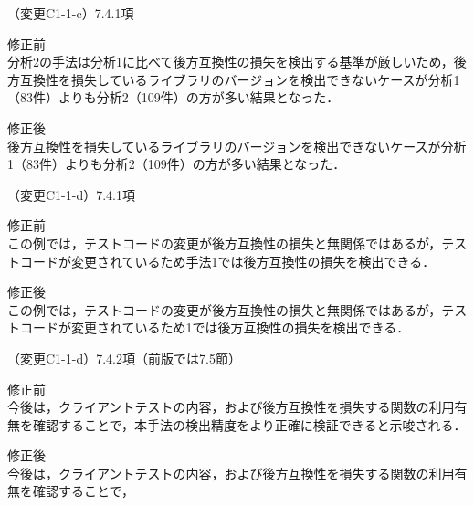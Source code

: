 \documentclass{jarticle} %
\def\subsection#1{ \vspace{1pc} {\gt #1} }
\begin{document}
\subsection{（変更C1-1-c）7.4.1項}
\vspace{-0.3cm}
\begin{description}
\item 修正前\\
\phantom{　}
分析2の手法は分析1に比べて後方互換性の損失を検出する基準が厳しいため，後方互換性を損失しているライブラリのバージョンを検出できないケースが分析1（83件）よりも分析2（109件）の方が多い結果となった．
\vspace{-0.3cm}
\item 修正後\\
\phantom{　}
\textcolor{red}{}後方互換性を損失しているライブラリのバージョンを検出できないケースが分析1（83件）よりも分析2（109件）の方が多い結果となった．
\end{description}

\subsection{（変更C1-1-d）7.4.1項}
\vspace{-0.3cm}
\begin{description}
\item 修正前\\
\phantom{　}
この例では，テストコードの変更が後方互換性の損失と無関係ではあるが，テストコードが変更されているため手法1では後方互換性の損失を検出できる．
\vspace{-0.3cm}
\item 修正後\\
\phantom{　}
この例では，テストコードの変更が後方互換性の損失と無関係ではあるが，テストコードが変更されているため\textcolor{red}{}1では後方互換性の損失を検出できる．
\end{description}

\subsection{（変更C1-1-d）7.4.2項（前版では7.5節）}
\vspace{-0.3cm}
\begin{description}
\item 修正前\\
\phantom{　}
今後は，クライアントテストの内容，および後方互換性を損失する関数の利用有無を確認することで，本手法の検出精度をより正確に検証できると示唆される．
\vspace{-0.3cm}
\item 修正後\\
\phantom{　}
今後は，クライアントテストの内容，および後方互換性を損失する関数の利用有無を確認することで，\textcolor{red}{}
\end{description}
\end{document}
